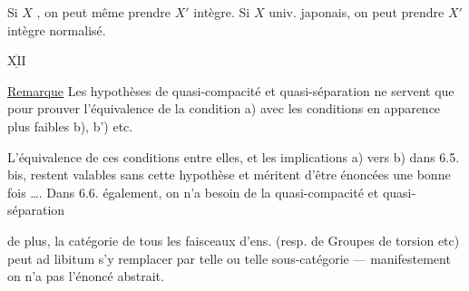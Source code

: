 Si $X$ , on peut même  prendre $X'$ intègre. Si $X$   univ. japonais, on peut prendre $X'$ intègre normalisé.


\diagram{\begin{tikzcd}[ampersand replacement=\&,column sep=large,row sep=small]
\deleted{\mathbb Rj^!(\mathbb Ri^!(\mu_{\alpha}))}\arrow[r]\arrow[d,phantom,"\deleted{\unsure{\wr\!\vert|\Vert|\wr}}" description]\&\deleted{\mathbb Rj^!(\unsure{\Lambda|A}_Y[-2]]}\arrow[d,phantom,"\deleted{\Vert}" description]\\
\deleted{\mathbb Rh^!\deleted{\unsure{i^!}}(\unsure{\mu_X|N_X|\mu_\alpha})}\&{}
\end{tikzcd}}


$\overline{\underline{\mathrm{XII}}}$

\uline{Remarque}  Les hypothèses de quasi-compacité et quasi-séparation ne servent que pour  prouver l'équivalence de la condition a) avec les conditions en apparence plus faibles b), b') etc.

L'équivalence de ces conditions entre elles, et les implications  a)  vers b)  dans 6.5. bis, restent valables sans cette hypothèse et méritent d'être énoncées une bonne fois \ldots. Dans 6.6. également, on n'a  besoin de la quasi-compacité et quasi-séparation \unsure{;|,}

de plus, la catégorie de tous les faisceaux d'ens. (resp. de Groupes de torsion  etc) peut ad libitum s'y remplacer par telle ou telle sous-catégorie --- manifestement on n'a pas  l'énoncé  abstrait.

